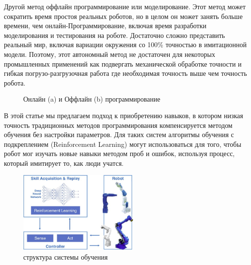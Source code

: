\documentclass[a4paper,12pt]{article}
\begin{document}
Другой метод оффлайн программирование или моделирование. Этот метод может сократить время простоя реальных роботов, но в целом он может занять больше времени, чем онлайн-Программирование, включая время разработки моделирования и тестирования на роботе. Достаточно сложно представить реальный мир, включая вариации окружения со 100\% точностью в имитационной модели. Поэтому, этот автономный метод не достаточен для некоторых промышленных применений как подвергать механической обработке точности и гибкая погрузо-разгрузочная работа где необходимая точность выше чем точность робота.


\begin{figure}[h]%
    \centering
    \qquad
    \caption{Онлайн (a) и Оффлайн (b) программирование}%
    \label{fig:example}%
\end{figure}

\newpage
В этой статье мы предлагаем подход к приобретению навыков, в котором низкая точность традиционных методов программирования компенсируется методом обучения без настройки параметров.
Для таких систем алгоритмы обучения с подкреплением (Reinforcement Learning) могут использоваться для того, чтобы робот мог изучать новые навыки методом проб и ошибок, используя процесс, который имитирует то, как люди учатся.

\begin{figure}[h]
    \centering
    \includegraphics[width=6cm]{img/Rl-robot.jpg}
    \caption{структура системы обучения}
    \label{fig:my_label}
\end{figure}
\end{document}
